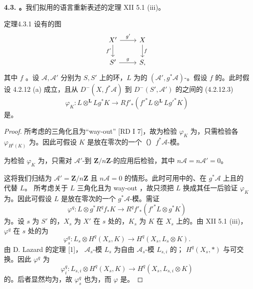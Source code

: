 \textbf{4.3. 。}我们拟用的语言重新表述的定理 XII 5.1 (iii)。
\begin{SGAresult}{定理}{4.3.1}
设有的图
\[\begin{tikzcd}X'\arrow[r,"g'"]\arrow[d,"f'"']&X\arrow[d,"f"]\\S'\arrow[r,"g"]&S,\end{tikzcd}\]
其中 $f$ 。设 $\mathscr A,\mathscr A'$ 分别为 $S,S'$ 上的环，$L$ 为的 $(\mathscr A',g^*\mathscr A)$-。假设 $f$ 的。此时假设 4.2.12 (a) 成立，且从 $D^-(X,f^*\mathscr A)$ 到 $D^-(S',\mathscr A')$ 的之间的 (4.2.12.3)
\[\varphi_K:L\otimes^{\mathbf L}Lg^*K\longrightarrow Rf'_*(f'^*L\otimes^{\mathbf L}Lg'^*K)\]
是。
\end{SGAresult}
\begin{proof}
所考虑的三角化且为“way-out” [RD I 7]，故为检验 $\varphi_K$ 为，只需检验各 $\varphi_{H^i(K)}$ 为。因此可假设 $K$ 是放在零次的一个（）$f^*\mathscr A$-模。

为检验 $\varphi_K$ 为，只需对 $\mathscr A'$-到 $\mathbf Z/n\mathbf Z$-的应用后检验，其中 $n\mathscr A=n\mathscr A'=0$。

这将我们归结为 $\mathscr A'=\mathbf Z/n\mathbf Z$ 且 $n\mathscr A=0$ 的情形。此时可用中的、在 $g^*\mathscr A$ 上且的代替 $L$。
所考虑关于 $L$ 三角化且为 way-out ，故只须把 $L$ 换成其任一后验证 $\varphi_K$ 为。因此可假设 $L$ 是放在零次的一个 $g^*\mathscr A$-模。需证
\[\varphi^q:L\otimes g^*R^qf_*K\longrightarrow R^qf'_*(f'^*L\otimes g^*K)\]
为。设 $s$ 为 $S'$ 的，$X_s$ 为 $X'$ 在 $s$ 处的，$K_s$ 为 $K$ 在 $X_s$ 上的。由 XII 5.1 (iii)，$\varphi^q$ 在 $s$ 处的为
\[\varphi_s^q:L_s\otimes H^q(X_s,K)\longrightarrow H^q(X_s,L_s\otimes K).\]
由 D. Lazard 的定理 [1]， $\mathscr A_s$-模 $L_s$ 为自由 $\mathscr A_s$-模 $L_{s,i}$ 的； $H^q(X_s,*)$ 与可交换。因此 $\varphi^q$ 为
\[\varphi_i^q:L_{s,i}\otimes H^q(X_s,K)\longrightarrow H^q(X_s,L_{s,i}\otimes K)\]
的。后者显然均为，故 $\varphi_s^q$ 也为，而 $\varphi$ 是。
\end{proof}
